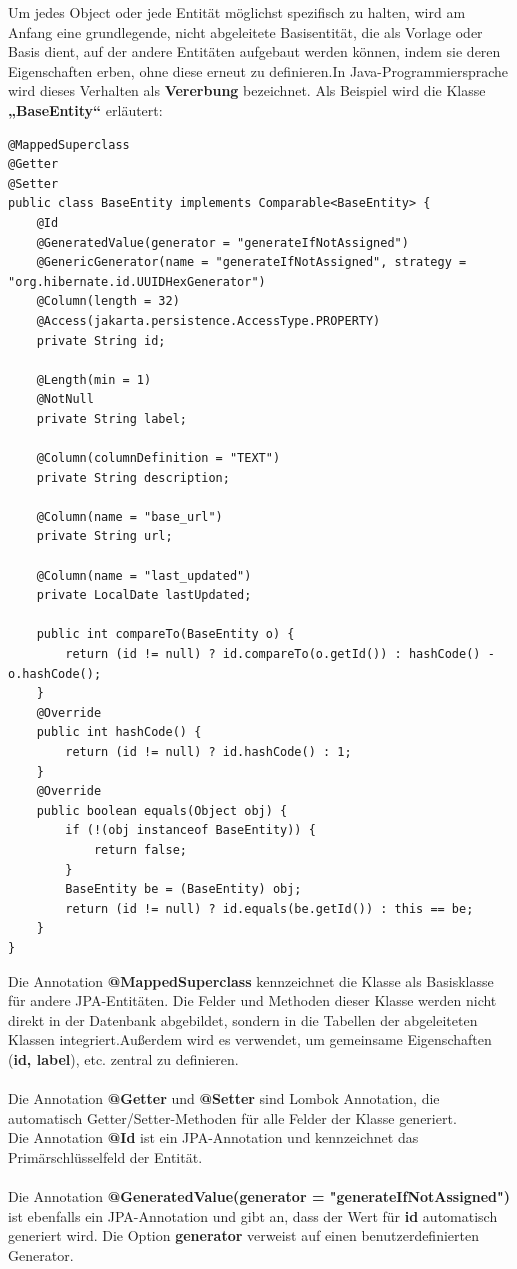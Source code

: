 \documentclass[a4paper,12pt]{scrreprt}
\begin{document}
	Um jedes Object oder jede Entität möglichst spezifisch zu halten, wird am Anfang eine grundlegende, nicht abgeleitete Basisentität, die als Vorlage oder Basis dient, auf der andere Entitäten aufgebaut werden können, indem sie deren Eigenschaften erben, ohne diese erneut zu definieren.In Java-Programmiersprache wird dieses Verhalten als \textbf{Vererbung} bezeichnet. Als Beispiel wird die Klasse \textbf{„BaseEntity“}  erläutert:
\begin{lstlisting}
@MappedSuperclass
@Getter
@Setter
public class BaseEntity implements Comparable<BaseEntity> {
	@Id
	@GeneratedValue(generator = "generateIfNotAssigned")
	@GenericGenerator(name = "generateIfNotAssigned", strategy = "org.hibernate.id.UUIDHexGenerator")
	@Column(length = 32)
	@Access(jakarta.persistence.AccessType.PROPERTY)
	private String id;
			
	@Length(min = 1)
	@NotNull
	private String label;
			
	@Column(columnDefinition = "TEXT")
	private String description;
			
	@Column(name = "base_url")
	private String url;
			
	@Column(name = "last_updated")
	private LocalDate lastUpdated;
			
	public int compareTo(BaseEntity o) {
		return (id != null) ? id.compareTo(o.getId()) : hashCode() - o.hashCode();
	}
	@Override
	public int hashCode() {
		return (id != null) ? id.hashCode() : 1;
	}
	@Override
	public boolean equals(Object obj) {
		if (!(obj instanceof BaseEntity)) {
			return false;
		}
		BaseEntity be = (BaseEntity) obj;
		return (id != null) ? id.equals(be.getId()) : this == be;
	}
}	
\end{lstlisting}
	Die Annotation \textbf{@MappedSuperclass} kennzeichnet die Klasse als Basisklasse für andere JPA-Entitäten. Die Felder und Methoden dieser Klasse werden nicht direkt in der Datenbank abgebildet, sondern in die Tabellen der abgeleiteten Klassen integriert.Außerdem wird es verwendet, um gemeinsame Eigenschaften (\textbf{id, label}), etc. zentral zu definieren.\\ \\
	Die Annotation \textbf{@Getter} und \textbf{@Setter} sind Lombok Annotation, die automatisch Getter/Setter-Methoden für alle Felder der Klasse generiert.\\
	Die Annotation \textbf{@Id} ist ein JPA-Annotation und kennzeichnet das Primärschlüsselfeld der Entität.\\ \\
	Die Annotation \textbf{@GeneratedValue(generator = "generateIfNotAssigned")} ist ebenfalls ein JPA-Annotation und gibt an, dass der Wert für \textbf{id} automatisch generiert wird. Die Option \textbf{generator} verweist auf einen benutzerdefinierten Generator.\\ \\
\end{document}

